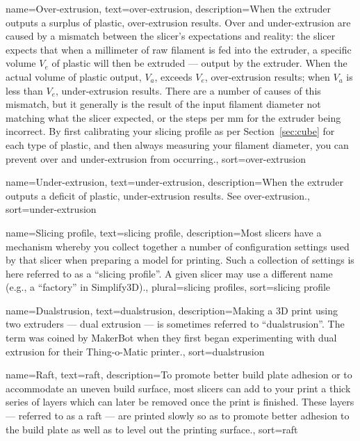 {
        name={Over-extrusion},
        text={over-extrusion},
        description={When the extruder outputs a surplus of plastic,
over-extrusion results.  Over and under-extrusion are caused by a mismatch
between the slicer's expectations and reality: the slicer expects that when
a millimeter of raw filament is fed into the extruder, a specific volume
$V_e$ of plastic will then be extruded --- output by the extruder.  When
the actual volume of plastic output, $V_a$, exceeds $V_e$, over-extrusion
results; when $V_a$ is less than $V_e$, under-extrusion results.  There are
a number of causes of this mismatch, but it generally is the result of the
input filament diameter not matching what the slicer expected, or the
steps per mm for the extruder being incorrect.  By first calibrating your
slicing profile as per Section~\ref{sec:cube} for each type of plastic, and
then always measuring your filament diameter, you can prevent over and
under-extrusion from occurring.},
       sort=over-extrusion
}

{
        name={Under-extrusion},
        text={under-extrusion},
        description={When the extruder outputs a deficit of plastic,
under-extrusion results. See \gls{over-extrusion}.},
       sort=under-extrusion
}

{
        name={Slicing profile},
        text={slicing profile},
        description={Most slicers have a mechanism whereby you collect
together a number of configuration settings used by that slicer when
preparing a model for printing.  Such a collection of settings is here
referred to as a ``slicing profile''.  A given slicer may use a different
name (e.g., a ``factory'' in Simplify3D).},
        plural={slicing profiles},
        sort=slicing profile
}

{
        name={Dualstrusion},
        text={dualstrusion},
        description={Making a 3D print using two extruders --- dual extrusion
--- is sometimes referred to ``dualstrusion''.  The term was coined by
MakerBot when they first began experimenting with dual extrusion for
their Thing-o-Matic printer.},
      sort=dualstrusion
}

{
        name={Raft},
        text={raft},
        description={To promote better build plate adhesion or to accommodate an uneven build surface, most slicers can add to your print a thick series of layers which can later be removed once the print is finished.  These layers --- referred to as a raft --- are printed slowly so as to promote better adhesion to the build plate as well as to level out the printing surface.},
        sort=raft
}

